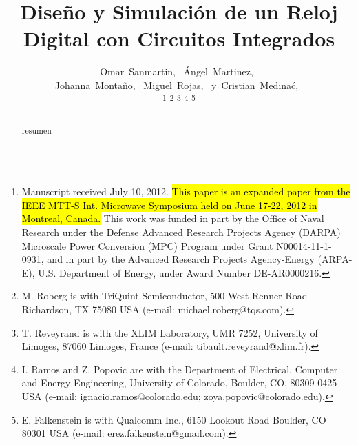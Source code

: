     \title{Diseño y Simulación de un Reloj Digital con Circuitos Integrados}
  \author{Omar~Sanmartin,~
      Ángel~Martinez,~\\
      Johanna~Montaño,~
      Miguel~Rojas,~
      y~Cristian~Medina\'c,~%

  \thanks{Manuscript received July 10, 2012. \hl{This paper is an expanded paper from the IEEE MTT-S Int. Microwave Symposium held on June 17-22, 2012 in Montreal, Canada.} This work was funded in part by the Office of Naval Research under the Defense Advanced Research Projects Agency (DARPA) Microscale Power Conversion (MPC) Program under Grant N00014-11-1-0931, and in part by the Advanced Research Projects Agency-Energy (ARPA-E), U.S. Department of Energy, under Award Number DE-AR0000216.}
  \thanks{M. Roberg is with TriQuint Semiconductor, 500 West Renner Road Richardson, TX 75080 USA (e-mail: michael.roberg@tqs.com).}%
  \thanks{T. Reveyrand is with the XLIM Laboratory, UMR 7252, University of Limoges, 87060 Limoges, France (e-mail: tibault.reveyrand@xlim.fr).}%
  \thanks{I. Ramos and Z. Popovic are with the Department of Electrical, Computer and Energy Engineering, University of Colorado, Boulder, CO, 80309-0425 USA (e-mail: ignacio.ramos@colorado.edu; zoya.popovic@colorado.edu).}%
  \thanks{E. Falkenstein is with Qualcomm Inc., 6150 Lookout Road
Boulder, CO 80301 USA (e-mail: erez.falkenstein@gmail.com).}}  




\maketitle



\begin{abstract}
resumen
\end{abstract}


